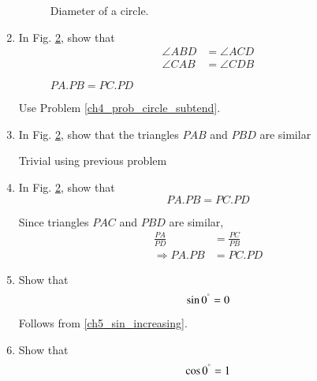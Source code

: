 \begin{enumerate}[label=\arabic*.,ref=\thesubsection.\theenumi]
%
\begin{figure}[!ht]
	\begin{center}
		
		\resizebox{\columnwidth}{!}{}
	\end{center}
	\caption{Diameter of a circle.}
	\label{ch4_circle_dia}	
\end{figure}
\item
	In Fig. \ref{ch4_chord_product}, show that 
	\begin{equation}
	\begin{split}
\angle ABD &= \angle ACD \\
\angle CAB &= \angle CDB	
	\end{split}
	\end{equation}

\begin{figure}[!ht]
	\begin{center}
		
		\resizebox{\columnwidth}{!}{}
	\end{center}
	\caption{$PA.PB = PC.PD$}
	\label{ch4_chord_product}	
\end{figure}
%
%
\solution Use Problem \ref{ch4_prob_circle_subtend}.
%
\item
	In Fig. \ref{ch4_chord_product}, show that the triangles $PAB$ and $PBD$ are similar

\solution Trivial using previous problem
\item
	In Fig. \ref{ch4_chord_product}, show that 
	\begin{equation}
	PA.PB = PC.PD
	\end{equation}

%
\solution Since triangles $PAC$ and $PBD$ are similar, 
%
\begin{align}
\frac{PA}{PD} &= \frac{PC}{PB} \\
\Rightarrow PA.PB &= PC.PD
\end{align}
%
%
\item
	Show that 
	\begin{equation}
	\label{ch5_sin_zero}
	\sin 0^{\degree} = 0
	\end{equation}

\solution Follows from \eqref{ch5_sin_increasing}.
%
\item
	Show that 
	\begin{equation}
	\label{ch5_sin_zero}
	\cos 0^{\degree} = 1
	\end{equation}
	

\end{enumerate}
